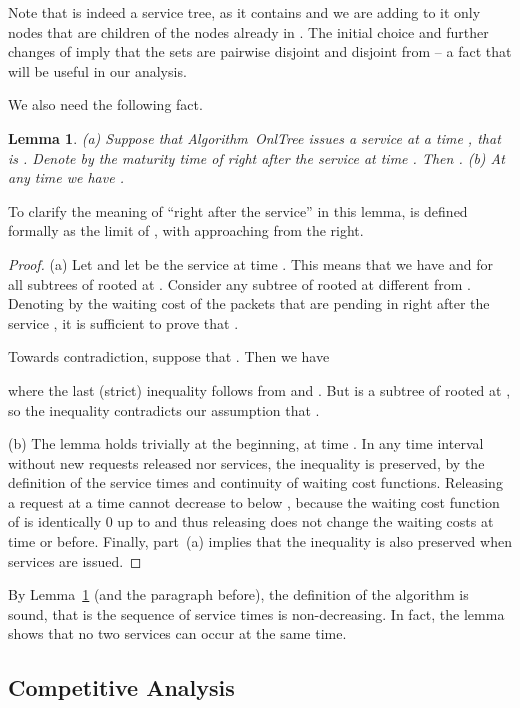 \documentclass[a4paper]{article}
\newtheorem{lemma}[theorem]{Lemma}
\newcommand{\OnAlgTreesGeneral}{{\sc OnlTree}}
\begin{document}
\medskip

Note that  is indeed a service tree, as it contains  and we are
adding to it only nodes  that are children of the nodes already in .
The initial choice and further changes of  imply that the sets
 are pairwise disjoint and disjoint from  -- a fact that will
be useful in our analysis. 


We also need the following fact.

\begin{lemma}\label{lem: maturity times of q}
	(a) Suppose that Algorithm~{\OnAlgTreesGeneral} issues a service at
	a time , that is .
	Denote by  the maturity time of  right
	after the service at time . Then .
(b) At any time  we have	.
\end{lemma}

To clarify the meaning of ``right after the service''
in this lemma,  is defined formally as the 
limit of , with  approaching  from the right.

\begin{proof}
(a) 
Let  and let  be the service at time
. This means that we have  and
 for all subtrees  of  rooted at
.  Consider any subtree  of  rooted at  different from
.  Denoting by  the waiting cost of the packets that
are pending in  right after the service , it is sufficient
to prove that .

Towards contradiction, suppose that .
Then we have

where the last (strict) inequality follows from  and
.
But  is a subtree of  rooted at , so
the inequality 
contradicts our assumption that .	

(b)
The lemma holds trivially at the beginning, at time . In any time interval
without new requests released nor services, the inequality
 is preserved, by the definition of
the service times and continuity of waiting cost functions.
Releasing a request  at a time  
cannot decrease  to below , because the waiting cost function
of  is identically 0 up to  and thus
releasing  does not change the waiting costs at time  or before. 
Finally, part~(a) implies that the inequality is also preserved when
services are issued.
\end{proof}

By Lemma~\ref{lem: maturity times of q} (and the paragraph before),
the definition of the algorithm is sound, that is the sequence of
service times is non-decreasing. In fact, the lemma
shows that no two services can occur at the same time.
 

\subsection{Competitive Analysis}
\end{document}
